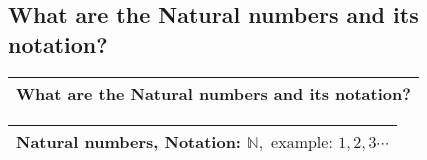 \subsection{What are the Natural numbers and its notation?}
\begin{small}
    \begin{tabularx}{1\textwidth}{
            p{}
        }
        \toprule
        What are the Natural numbers and its notation?
        \\
        \bottomrule

    \end{tabularx}
\end{small}
\begin{small}
    \begin{tabularx}{1\textwidth}{
            p{}
        }
        \toprule
            Natural numbers, Notation: $\mathbb{N}, \text{ example: } 1, 2, 3 \cdots$\\
        \bottomrule

    \end{tabularx}
\end{small}
